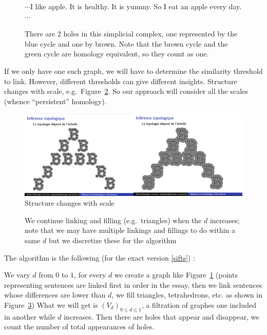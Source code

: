 \begin{figure}[H]
  \begin{minipage}{0.80\textwidth}
  
  \end{minipage}
  \begin{minipage}{0.19\textwidth}
  $\cdots$I like apple. It is healthy. It is yummy. So I eat an apple every day.
  $\cdots$
  \end{minipage}
  \caption{There are 2 holes in this simplicial complex,
  one represented by the blue cycle and one by brown.
  Note that the brown cycle and the green cycle are homology equivalent, so they count as one.}
  \label{apple}
\end{figure}

If we only have one such graph, we will have to determine the similarity threshold to link.
However, different thresholds can give different insights. Structure changes with scale, e.g.\ Figure~\ref{fig:scale}.
So our approach will consider all the scales (whence ``persistent'' homology).

\begin{figure}[H]
\centering
\includegraphics[width=14cm]{scale.png}
\caption{Structure changes with scale}
\label{fig:scale}
\end{figure}

\begin{figure}[H]
\centering

\caption{We continue linking and filling (e.g.\ triangles) when the $d$ increases; note that
we may have multiple linkings and fillings to do within a same $d$ but we discretize these
for the algorithm}
\label{filtration}
\end{figure}

The algorithm is the following (for the exact version \ref{sifts}) :

We vary $d$ from $0$ to $1$, for every $d$ we create a graph like Figure~\ref{apple}
(points representing sentences are linked first in order in the essay,
then we link sentences whose differences are lower than $d$,
we fill triangles, tetrahedrons, etc. as shown in Figure~\ref{filtration}) What we will get is
$(V_d)_{0\le d\le 1}$, a filtration of graphes one included in another while $d$ increases.
Then there are holes that appear and disappear, we count the number of total appearances of holes.

